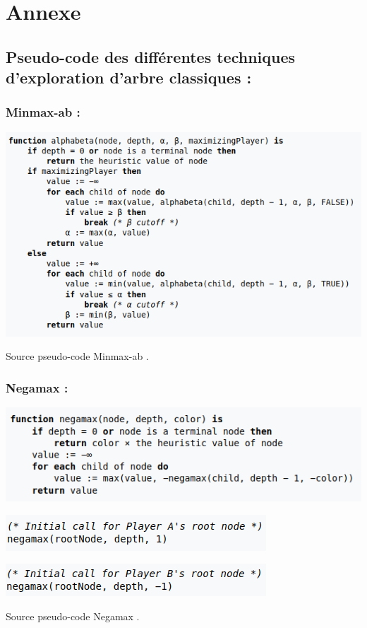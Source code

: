 \documentclass{article}
\begin{document}
\section{Annexe}
\subsection{Pseudo-code des différentes techniques d'exploration d'arbre classiques : }
\medskip
\subsubsection{Minmax-ab :}
\centerline{\includegraphics[scale = 0.5]{img/Alpha_beta_minmax.png}}
\medskip
Source pseudo-code Minmax-ab \cite{Minmax-ab_pc}.
\subsubsection{Negamax : }
\centerline{\includegraphics[scale = 0.5]{img/Negamax_1.png}}
\centerline{\includegraphics[scale = 0.5]{img/Negamax_2.png}}
\centerline{\includegraphics[scale = 0.5]{img/Negamax_3.png}}
\medskip
Source pseudo-code Negamax \cite{Negamax_pc}.
\end{document}
